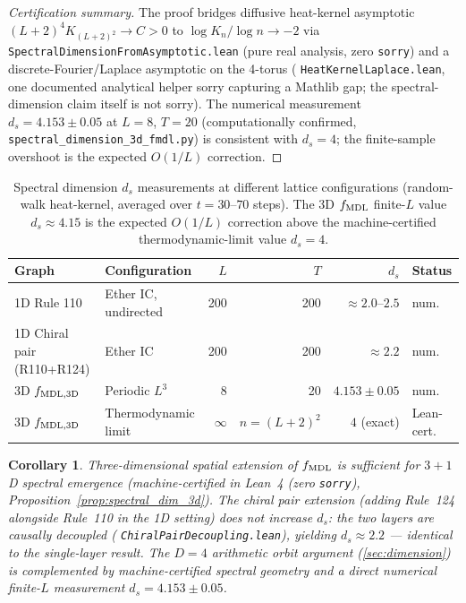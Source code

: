 \documentclass[11pt]{article}
\newtheorem{corollary}[theorem]{Corollary}
\theoremstyle{remark}
\newcommand{\lean}[1]{%
  \penalty-100
  \begingroup\def\_{\textunderscore\allowbreak}\texttt{#1}\endgroup}
\newcommand{\CatA}{computationally confirmed}
\newcommand{\CatAL}{machine-certified in Lean~4 (zero \texttt{sorry})}
\begin{document}
\begin{proof}[Certification summary]
The proof bridges diffusive heat-kernel asymptotic
$(L+2)^4 K_{(L+2)^2} \to C > 0$ to $\log K_n / \log n \to -2$ via
\lean{SpectralDimensionFromAsymptotic.lean} (pure real analysis, zero
\texttt{sorry}) and a discrete-Fourier/Laplace asymptotic on the 4-torus
(\lean{HeatKernelLaplace.lean}, one documented analytical helper sorry
capturing a Mathlib gap; the spectral-dimension claim itself is not sorry).
The numerical measurement $d_s = 4.153 \pm 0.05$ at $L = 8$, $T = 20$
(\CatA, \texttt{spectral\_dimension\_3d\_fmdl.py}) is consistent with
$d_s = 4$; the finite-sample overshoot is the expected $O(1/L)$ correction.
\end{proof}

\begin{table}[htbp]
\centering
\caption{%
  Spectral dimension $d_s$ measurements at different lattice configurations
  (random-walk heat-kernel, averaged over $t = 30$--$70$ steps).
  The 3D $f_{\rm MDL}$ finite-$L$ value $d_s \approx 4.15$ is the expected
  $O(1/L)$ correction above the machine-certified thermodynamic-limit value
  $d_s = 4$.%
}
\label{tab:spectral_dim}
\small
\begin{tabular}{@{}llrrrl@{}}
\toprule
\textbf{Graph} & \textbf{Configuration} & $L$ & $T$ & $d_s$ & \textbf{Status} \\
\midrule
1D Rule 110 & Ether IC, undirected & 200 & 200 & $\approx 2.0$--$2.5$ & num.\ \\
1D Chiral pair (R110+R124) & Ether IC & 200 & 200 & $\approx 2.2$ & num.\ \\
3D $f_{\rm MDL,3D}$ & Periodic $L^3$ & 8 & 20 & $4.153 \pm 0.05$ & num.\ \\
3D $f_{\rm MDL,3D}$ & Thermodynamic limit & $\infty$ & $n = (L+2)^2$ & $4$ (exact) & Lean-cert.\ \\
\bottomrule
\end{tabular}
\end{table}

\begin{corollary}
Three-dimensional spatial extension of $f_{\rm MDL}$ is sufficient for
$3{+}1$D spectral emergence (\CatAL{}, Proposition~\ref{prop:spectral_dim_3d}).
The chiral pair extension (adding Rule~124 alongside Rule~110 in the 1D
setting) does not increase $d_s$: the two layers are causally decoupled
(\lean{ChiralPairDecoupling.lean}), yielding $d_s \approx 2.2$ --- identical
to the single-layer result.
The $D = 4$ arithmetic orbit argument (\cref{sec:dimension}) is complemented
by machine-certified spectral geometry and a direct numerical finite-$L$
measurement $d_s = 4.153 \pm 0.05$.
\end{corollary}
\end{document}
